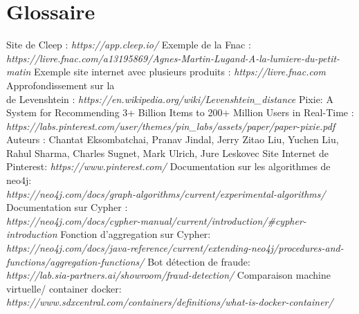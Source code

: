 \documentclass{article} %
\begin{document}
\section{Glossaire}
\begin{thebibliography}{9}
	Site de Cleep : \textit{https://app.cleep.io/}
	Exemple de la Fnac : \textit{https://livre.fnac.com/a13195869/Agnes-Martin-Lugand-A-la-lumiere-du-petit-matin}
	Exemple site internet avec plusieurs produits : \textit{https://livre.fnac.com}
	Approfondissement sur la \\
	 de Levenshtein : \textit{https://en.wikipedia.org/wiki/Levenshtein\_distance}
	Pixie: A System for Recommending 3+ Billion Items to 200+ Million Users in Real-Time :
	\textit{https://labs.pinterest.com/user/themes/pin\_labs/assets/paper/paper-pixie.pdf}\\
	Auteurs : Chantat Eksombatchai, Pranav Jindal, Jerry Zitao Liu, Yuchen Liu,
	Rahul Sharma, Charles Sugnet, Mark Ulrich, Jure Leskovec
	Site Internet de Pinterest: \textit{https://www.pinterest.com/}
	Documentation sur les algorithmes de neo4j: \\ \textit{https://neo4j.com/docs/graph-algorithms/current/experimental-algorithms/}
	Documentation sur Cypher :\\
	\textit{https://neo4j.com/docs/cypher-manual/current/introduction/\#cypher-introduction}
	Fonction d'aggregation sur Cypher:\\
	\textit{https://neo4j.com/docs/java-reference/current/extending-neo4j/procedures-and-functions/aggregation-functions/}
	Bot détection de fraude:\\
	\textit{https://lab.sia-partners.ai/showroom/fraud-detection/}
	Comparaison machine virtuelle/ container docker:\\
	\textit{https://www.sdxcentral.com/containers/definitions/what-is-docker-container/}
	
\end{thebibliography}
\newpage






\imtaMakeCover
\end{document}
